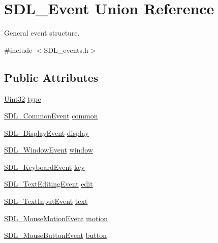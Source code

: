 \hypertarget{union_s_d_l___event}{}\section{S\+D\+L\+\_\+\+Event Union Reference}
\label{union_s_d_l___event}


General event structure.  




{\ttfamily \#include $<$S\+D\+L\+\_\+events.\+h$>$}

\subsection*{Public Attributes}
\begin{DoxyCompactItemize}
\item 
\mbox{\hyperlink{_s_d_l__stdinc_8h_add440eff171ea5f55cb00c4a9ab8672d}{Uint32}} \mbox{\hyperlink{union_s_d_l___event_a237648bec242d2d5835f1a4250ddfa46}{type}}
\item 
\mbox{\hyperlink{struct_s_d_l___common_event}{S\+D\+L\+\_\+\+Common\+Event}} \mbox{\hyperlink{union_s_d_l___event_abe5cb8767f93de55163c8ddd4562a7f2}{common}}
\item 
\mbox{\hyperlink{struct_s_d_l___display_event}{S\+D\+L\+\_\+\+Display\+Event}} \mbox{\hyperlink{union_s_d_l___event_afe513d46e191a9791988b9adab705ef6}{display}}
\item 
\mbox{\hyperlink{struct_s_d_l___window_event}{S\+D\+L\+\_\+\+Window\+Event}} \mbox{\hyperlink{union_s_d_l___event_a826936b3275406d857bc6654669fae71}{window}}
\item 
\mbox{\hyperlink{struct_s_d_l___keyboard_event}{S\+D\+L\+\_\+\+Keyboard\+Event}} \mbox{\hyperlink{union_s_d_l___event_ab99927835cc77a9b6bb50b419b4a27df}{key}}
\item 
\mbox{\hyperlink{struct_s_d_l___text_editing_event}{S\+D\+L\+\_\+\+Text\+Editing\+Event}} \mbox{\hyperlink{union_s_d_l___event_a9a7e3b67b2654d4c5fc509676c6a7183}{edit}}
\item 
\mbox{\hyperlink{struct_s_d_l___text_input_event}{S\+D\+L\+\_\+\+Text\+Input\+Event}} \mbox{\hyperlink{union_s_d_l___event_aa4fc65c559d69f33c057c0c23d8414b8}{text}}
\item 
\mbox{\hyperlink{struct_s_d_l___mouse_motion_event}{S\+D\+L\+\_\+\+Mouse\+Motion\+Event}} \mbox{\hyperlink{union_s_d_l___event_ac3c89e190faacbe84280cd539453bab6}{motion}}
\item 
\mbox{\hyperlink{struct_s_d_l___mouse_button_event}{S\+D\+L\+\_\+\+Mouse\+Button\+Event}} \mbox{\hyperlink{union_s_d_l___event_ab6da2fa2687e5f849f270adecc64785f}{button}}

\end{DoxyCompactItemize}
